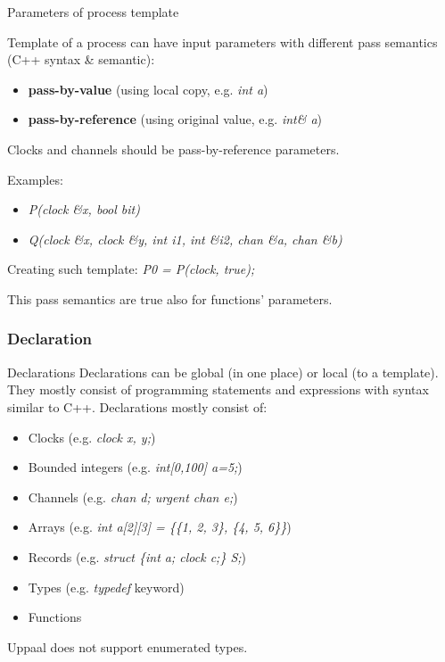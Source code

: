 \documentclass{beamer}
\begin{document}
\begin{frame}{Parameters of process template}
	
	Template of a process can have input parameters with different pass semantics (C++ syntax \& semantic):
	
	\begin{itemize}
		\item \textbf{pass-by-value} (using local copy, e.g. \textit{int a})
		\item \textbf{pass-by-reference} (using original value, e.g. \textit{int\& a})
	\end{itemize}
	
	Clocks and channels should be pass-by-reference parameters.\newline
	
	Examples:
	\begin{itemize}
		\item \textit{P(clock \&x, bool bit)}
		\item \textit{Q(clock \&x, clock \&y, int i1, int \&i2, chan \&a, chan \&b)}
	\end{itemize}
	Creating such template: \textit{P0 = P(clock, true);}\newline
	
	This pass semantics are true also for functions' parameters.	
\end{frame}

\subsubsection{Declaration}

\begin{frame}{Declarations}
	Declarations can be global (in one place) or local (to a template). They mostly consist of programming statements and expressions with syntax similar to C++. Declarations mostly consist of:
	\begin{itemize}
		\item Clocks (e.g. \textit{clock x, y;})
		\item Bounded integers (e.g. \textit{int[0,100] a=5;})
		\item Channels (e.g. \textit{chan d; urgent chan e;})
		\item Arrays (e.g. \textit{int a[2][3] = \{\{1, 2, 3\}, \{4, 5, 6\}\}})
		\item Records (e.g. \textit{struct \{int a; clock c;\} S;})
		\item Types (e.g. \textit{typedef} keyword)
		\item Functions
	\end{itemize}
	Uppaal does not support enumerated types.
\end{frame}
\end{document}
